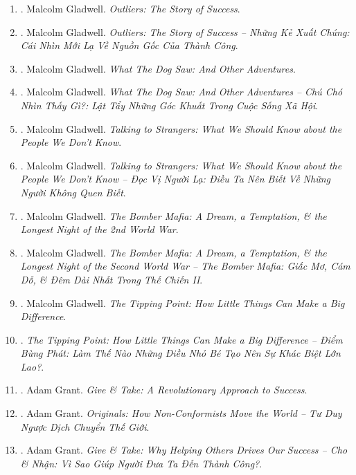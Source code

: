 \documentclass{article}
\begin{document}
\begin{enumerate}
	\item \cite{Gladwell2008}. Malcolm Gladwell. {\it Outliers: The Story of Success}.\hfill{\sf[reading]}
	\item \cite{Gladwell_outlier}. Malcolm Gladwell. {\it Outliers: The Story of Success -- Những Kẻ Xuất Chúng: Cái Nhìn Mới Lạ Về Nguồn Gốc Của Thành Công}.\hfill{\sf[done]}
	\item \cite{Gladwell2009}. Malcolm Gladwell. {\it What The Dog Saw: And Other Adventures}.\hfill{\sf[reading]}
	\item \cite{Gladwell_dog}. Malcolm Gladwell. {\it What The Dog Saw: And Other Adventures -- Chú Chó Nhìn Thấy Gì?: Lật Tẩy Những Góc Khuất Trong Cuộc Sống Xã Hội}.\hfill{\sf[done]}
	\item \cite{Gladwell2019}. Malcolm Gladwell. {\it Talking to Strangers: What We Should Know about the People We Don't Know}.\hfill{\sf[reading]}
	\item \cite{Gladwell_stranger}. Malcolm Gladwell. {\it Talking to Strangers: What We Should Know about the People We Don't Know -- Đọc Vị Người Lạ: Điều Ta Nên Biết Về Những Người Không Quen Biết}.\hfill{\sf[done]}
	\item \cite{Gladwell2021}. Malcolm Gladwell. {\it The Bomber Mafia: A Dream, a Temptation, \& the Longest Night of the 2nd World War}.\hfill{\sf[reading]}
	\item \cite{Gladwell_bomber_mafia}. Malcolm Gladwell. {\it The Bomber Mafia: A Dream, a Temptation, \& the Longest Night of the Second World War -- The Bomber Mafia: Giấc Mơ, Cám Dỗ, \& Đêm Dài Nhất Trong Thế Chiến II}.\hfill{\sf[done]}
	\item \cite{Gladwell2022}. Malcolm Gladwell. {\it The Tipping Point: How Little Things Can Make a Big Difference}.\hfill{\sf[reading]}
	\item \cite{Gladwell_tipping_point}. {\it The Tipping Point: How Little Things Can Make a Big Difference -- Điểm Bùng Phát: Làm Thế Nào Những Điều Nhỏ Bé Tạo Nên Sự Khác Biệt Lớn Lao?}.\hfill{\sf[done]}
	\item \cite{Grant_give_take}. {\sc Adam Grant}. {\it Give \& Take: A Revolutionary Approach to Success}.\hfill{\sf[reading]}
	\item \cite{Grant2020}. Adam Grant. {\it Originals: How Non-Conformists Move the World -- Tư Duy Ngược Dịch Chuyển Thế Giới}.\hfill{\sf[done]}
	\item \cite{Grant_give_take_VN}. Adam Grant. {\it Give \& Take: Why Helping Others Drives Our Success -- Cho \& Nhận: Vì Sao Giúp Người Đưa Ta Đến Thành Công?}.\hfill{\sf[done]}

\end{enumerate}
\end{document}
